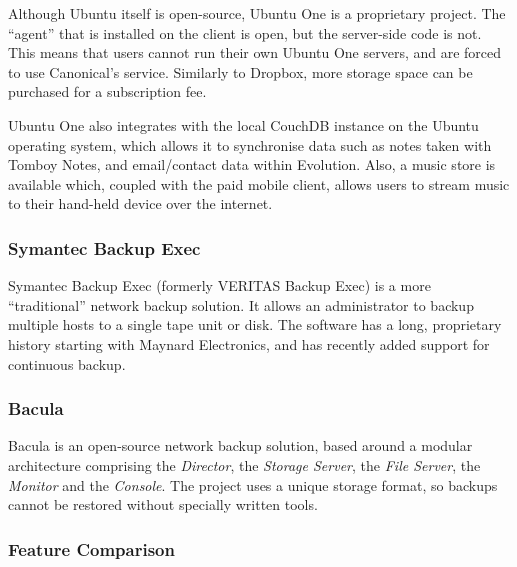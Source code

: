 Although Ubuntu itself is open-source, Ubuntu One is a proprietary project. The
``agent'' that is installed on the client is open, but the server-side code is
not. This means that users cannot run their own Ubuntu One servers, and are
forced to use Canonical's service. Similarly to Dropbox, more storage space can
be purchased for a subscription fee.

Ubuntu One also integrates with the local CouchDB instance on the Ubuntu
operating system, which allows it to synchronise data such as notes taken with
Tomboy Notes, and email/contact data within Evolution. Also, a music store is
available which, coupled with the paid mobile client, allows users to stream
music to their hand-held device over the internet.

\subsubsection{Symantec Backup Exec}

Symantec Backup Exec (formerly VERITAS Backup Exec) is a more ``traditional''
network backup solution. It allows an administrator to backup multiple hosts to
a single tape unit or disk. The software has a long, proprietary history
starting with Maynard Electronics, and has recently added support for
continuous backup.

\subsubsection{Bacula}

Bacula is an open-source network backup solution, based around a modular
architecture comprising the \emph{Director}, the \emph{Storage Server}, the
\emph{File Server}, the \emph{Monitor} and the \emph{Console}. The project uses
a unique storage format, so backups cannot be restored without specially
written tools.

\subsubsection{Feature Comparison}

